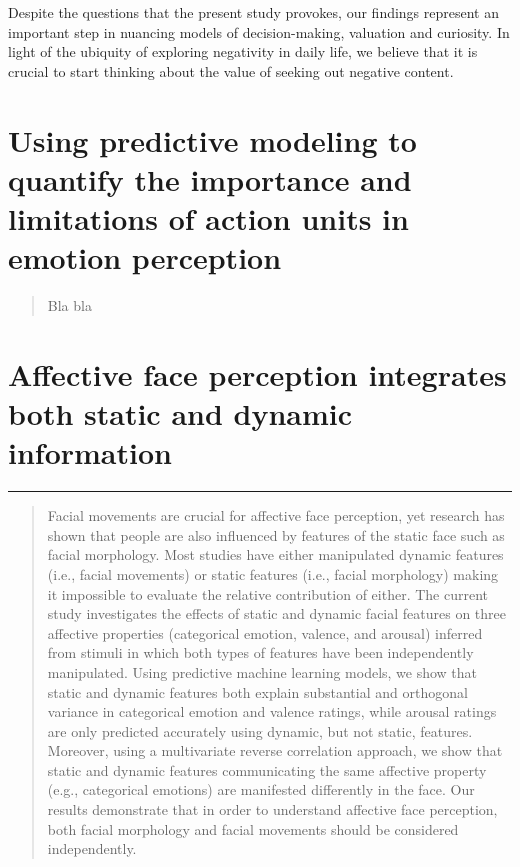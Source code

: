 \documentclass[11pt,american,]{memoir} %
\begin{document}
Despite the questions that the present study provokes, our findings represent an important step in nuancing models of decision-making, valuation and curiosity. In light of the ubiquity of exploring negativity in daily life, we believe that it is crucial to start thinking about the value of seeking out negative content.

\hypertarget{hypothesis-kernel-analysis}{%
\chapter{Using predictive modeling to quantify the importance and limitations of action units in emotion perception}\label{hypothesis-kernel-analysis}}


\newpage
\normalsize

\begin{abstract}
Bla bla
\end{abstract} \newpage

\hypertarget{static-vs-dynamic}{%
\chapter{Affective face perception integrates both static and dynamic information}\label{static-vs-dynamic}}


\vspace*{\fill}

\begin{center}\rule{0.5\linewidth}{0.5pt}\end{center}

\newpage
\normalsize

\begin{abstract}
Facial movements are crucial for affective face perception, yet research has shown that people are also influenced by features of the static face such as facial morphology. Most studies have either manipulated dynamic features (i.e., facial movements) or static features (i.e., facial morphology) making it impossible to evaluate the relative contribution of either. The current study investigates the effects of static and dynamic facial features on three affective properties (categorical emotion, valence, and arousal) inferred from stimuli in which both types of features have been independently manipulated. Using predictive machine learning models, we show that static and dynamic features both explain substantial and orthogonal variance in categorical emotion and valence ratings, while arousal ratings are only predicted accurately using dynamic, but not static, features. Moreover, using a multivariate reverse correlation approach, we show that static and dynamic features communicating the same affective property (e.g., categorical emotions) are manifested differently in the face. Our results demonstrate that in order to understand affective face perception, both facial morphology and facial movements should be considered independently.
\end{abstract} \newpage
\end{document}
